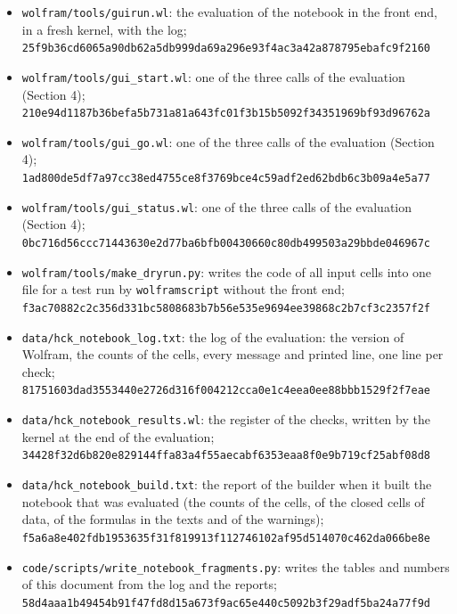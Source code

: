\documentclass[
  10pt,
]{article}
\begin{document}
\begin{itemize}
  the TeX of the formulas of the texts into two-dimensional boxes;\\
  \texttt{a51dc3cc667c8b39366b517ba91b45502dca35e7eef95e9f796693c2853d6c12}
\item
  \texttt{wolfram/tools/guirun.wl}: the evaluation of the notebook in
  the front end, in a fresh kernel, with the log;\\
  \texttt{25f9b36cd6065a90db62a5db999da69a296e93f4ac3a42a878795ebafc9f2160}
\item
  \texttt{wolfram/tools/gui\_start.wl}: one of the three calls of the
  evaluation (Section 4);\\
  \texttt{210e94d1187b36befa5b731a81a643fc01f3b15b5092f34351969bf93d96762a}
\item
  \texttt{wolfram/tools/gui\_go.wl}: one of the three calls of the
  evaluation (Section 4);\\
  \texttt{1ad800de5df7a97cc38ed4755ce8f3769bce4c59adf2ed62bdb6c3b09a4e5a77}
\item
  \texttt{wolfram/tools/gui\_status.wl}: one of the three calls of the
  evaluation (Section 4);\\
  \texttt{0bc716d56ccc71443630e2d77ba6bfb00430660c80db499503a29bbde046967c}
\item
  \texttt{wolfram/tools/make\_dryrun.py}: writes the code of all input
  cells into one file for a test run by \texttt{wolframscript} without
  the front end;\\
  \texttt{f3ac70882c2c356d331bc5808683b7b56e535e9694ee39868c2b7cf3c2357f2f}
\item
  \texttt{data/hck\_notebook\_log.txt}: the log of the evaluation: the
  version of Wolfram, the counts of the cells, every message and printed
  line, one line per check;\\
  \texttt{81751603dad3553440e2726d316f004212cca0e1c4eea0ee88bbb1529f2f7eae}
\item
  \texttt{data/hck\_notebook\_results.wl}: the register of the checks,
  written by the kernel at the end of the evaluation;\\
  \texttt{34428f32d6b820e829144ffa83a4f55aecabf6353eaa8f0e9b719cf25abf08d8}
\item
  \texttt{data/hck\_notebook\_build.txt}: the report of the builder when
  it built the notebook that was evaluated (the counts of the cells, of
  the closed cells of data, of the formulas in the texts and of the
  warnings);\\
  \texttt{f5a6a8e402fdb1953635f31f819913f112746102af95d514070c462da066be8e}
\item
  \texttt{code/scripts/write\_notebook\_fragments.py}: writes the tables
  and numbers of this document from the log and the reports;\\
  \texttt{58d4aaa1b49454b91f47fd8d15a673f9ac65e440c5092b3f29adf5ba24a77f9d}
\end{itemize}
\end{document}
